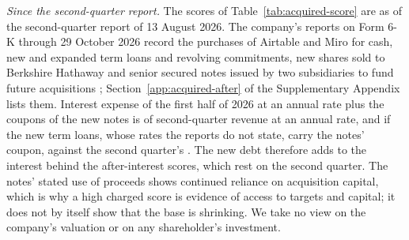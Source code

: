 \noindent\emph{Since the second-quarter report.} The scores of Table~\ref{tab:acquired-score} are as of the second-quarter report of 13 August 2026. The company's reports on Form 6-K through 29 October 2026 record the purchases of Airtable and Miro for cash, new and expanded term loans and revolving commitments, new shares sold to Berkshire Hathaway and senior secured notes issued by two subsidiaries to fund future acquisitions \citep{bendingspoons2026sixk}; Section~\ref{app:acquired-after} of the Supplementary Appendix lists them. Interest expense of the first half of 2026 at an annual rate plus the coupons of the new notes is \acqRunRateShQ{} of second-quarter revenue at an annual rate, and \acqRunRateShQHi{} if the new term loans, whose rates the reports do not state, carry the notes' coupon, against the second quarter's \acqQTwoInt. The new debt therefore adds to the interest behind the after-interest scores, which rest on the second quarter. The notes' stated use of proceeds shows continued reliance on acquisition capital, which is why a high charged score is evidence of access to targets and capital; it does not by itself show that the base is shrinking. We take no view on the company's valuation or on any shareholder's investment.

